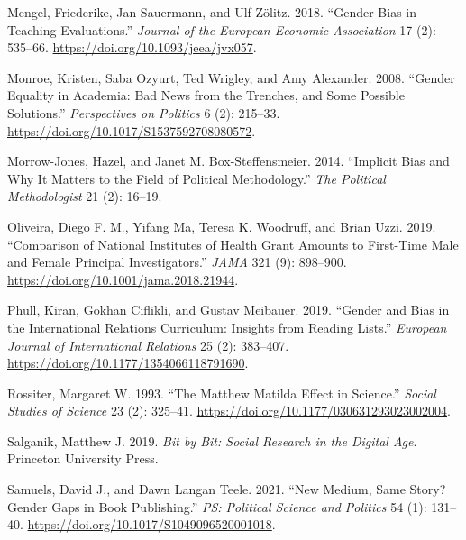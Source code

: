 \documentclass[
]{ccr}
\newlength{\cslhangindent}
\newlength{\cslentryspacingunit} %
\newenvironment{CSLReferences}[2] %
 {%
  \setlength{\parindent}{0pt}
  \ifodd #1
  \let\oldpar\par
  \def\par{\hangindent=\cslhangindent\oldpar}
  \fi
  \setlength{\parskip}{#2\cslentryspacingunit}
 }%
 {}
\begin{document}
\begin{CSLReferences}{1}{0}
\leavevmode{}%
Mengel, Friederike, Jan Sauermann, and Ulf Zölitz. 2018. {``Gender
{Bias} in {Teaching} {Evaluations}.''} \emph{Journal of the European
Economic Association} 17 (2): 535--66.
\url{https://doi.org/10.1093/jeea/jvx057}.

\leavevmode{}%
Monroe, Kristen, Saba Ozyurt, Ted Wrigley, and Amy Alexander. 2008.
{``Gender {Equality} in {Academia}: {Bad} {News} from the {Trenches},
and {Some} {Possible} {Solutions}.''} \emph{Perspectives on Politics} 6
(2): 215--33. \url{https://doi.org/10.1017/S1537592708080572}.

\leavevmode{}%
Morrow-Jones, Hazel, and Janet M. Box-Steffensmeier. 2014. {``Implicit
{Bias} and {Why} {It} {Matters} to the {Field} of {Political}
{Methodology}.''} \emph{The Political Methodologist} 21 (2): 16--19.

\leavevmode{}%
Oliveira, Diego F. M., Yifang Ma, Teresa K. Woodruff, and Brian Uzzi.
2019. {``Comparison of {National} {Institutes} of {Health} {Grant}
{Amounts} to {First}-{Time} {Male} and {Female} {Principal}
{Investigators}.''} \emph{JAMA} 321 (9): 898--900.
\url{https://doi.org/10.1001/jama.2018.21944}.

\leavevmode{}%
Phull, Kiran, Gokhan Ciflikli, and Gustav Meibauer. 2019. {``Gender and
Bias in the {International} {Relations} Curriculum: {Insights} from
Reading Lists.''} \emph{European Journal of International Relations} 25
(2): 383--407. \url{https://doi.org/10.1177/1354066118791690}.

\leavevmode{}%
Rossiter, Margaret W. 1993. {``The {Matthew} {Matilda} Effect in
Science.''} \emph{Social Studies of Science} 23 (2): 325--41.
\url{https://doi.org/10.1177/030631293023002004}.

\leavevmode{}%
Salganik, Matthew J. 2019. \emph{Bit by Bit: {Social} Research in the
Digital Age}. Princeton University Press.

\leavevmode{}%
Samuels, David J., and Dawn Langan Teele. 2021. {``New {Medium}, {Same}
{Story}? {Gender} {Gaps} in {Book} {Publishing}.''} \emph{PS: Political
Science and Politics} 54 (1): 131--40.
\url{https://doi.org/10.1017/S1049096520001018}.


\end{CSLReferences}
\end{document}
